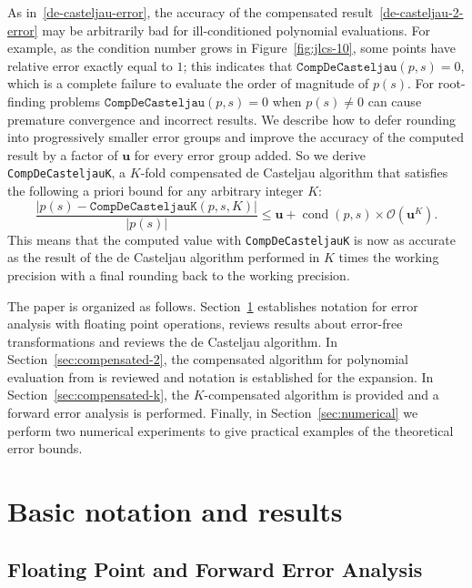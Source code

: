 \documentclass[3p, authoryear, square]{elsarticle}
\theoremstyle{definition}
\newcommand{\cond}[1]{\operatorname{cond}\left(#1\right)}
\newcommand{\bigO}[1]{\mathcal{O}\left(#1\right)}
\newcommand{\mach}{\mathbf{u}}
\begin{document}
As in~\eqref{de-casteljau-error}, the accuracy of the compensated
result~\eqref{de-casteljau-2-error} may be arbitrarily bad for ill-conditioned
polynomial evaluations. For example, as the condition number grows in
Figure~\ref{fig:jlcs-10}, some points have relative error exactly equal to
\(1\); this indicates that \(\mathtt{CompDeCasteljau}(p, s) = 0\), which is
a complete failure to evaluate the order of magnitude of \(p(s)\). For
root-finding problems \(\mathtt{CompDeCasteljau}(p, s) = 0\) when
\(p(s) \neq 0\) can cause premature convergence and incorrect results.
We describe how to defer rounding into progressively
smaller error groups and improve the accuracy of the computed result by a
factor of \(\mach\) for every error group added. So we derive
\texttt{CompDeCasteljauK}, a \(K\)-fold compensated de Casteljau algorithm
that satisfies the following a priori bound for any arbitrary integer \(K\):
\begin{equation}
  \frac{\left|p(s) - \mathtt{CompDeCasteljauK}(p, s, K)\right|}{
    \left|p(s)\right|} \leq \mach + \cond{p, s} \times
    \bigO{\mach^K}.
\end{equation}
This means that the computed value with \texttt{CompDeCasteljauK} is now
as accurate as the result of the de Casteljau algorithm performed in
\(K\) times the working precision with a final rounding back to the
working precision.

The paper is organized as follows. Section~\ref{sec:notation} establishes
notation for error analysis with floating point operations, reviews
results about error-free transformations and reviews the
de Casteljau algorithm. In Section~\ref{sec:compensated-2},
the compensated algorithm for polynomial evaluation from \cite{Jiang2010} is
reviewed and notation is established for the expansion. In
Section~\ref{sec:compensated-k}, the \(K\)-compensated algorithm is provided
and a forward error analysis is performed. Finally, in
Section~\ref{sec:numerical} we perform two numerical experiments to
give practical examples of the theoretical error bounds.

\section{Basic notation and results}\label{sec:notation}

\subsection{Floating Point and Forward Error Analysis}
\end{document}
